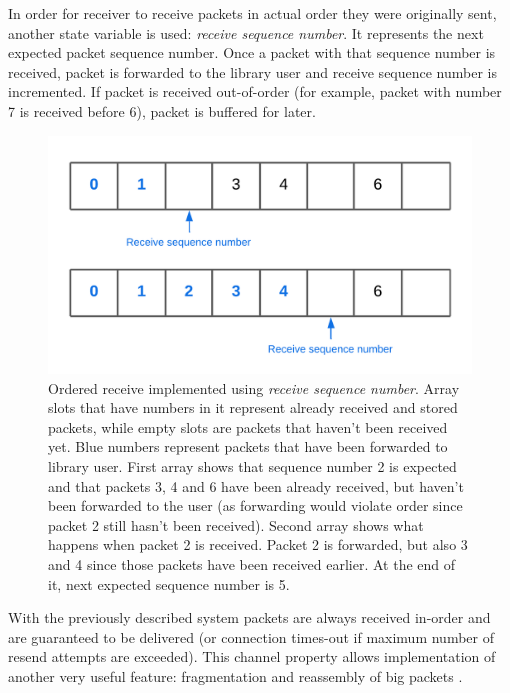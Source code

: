 \documentclass[times, utf8, diplomski]{fer}
\begin{document}
In order for receiver to receive packets in actual order they were originally sent, another state variable is used: \textit{receive sequence number}. It represents the next expected packet sequence number. Once a packet with that sequence number is received, packet is forwarded to the library user and receive sequence number is incremented. If packet is received out-of-order (for example, packet with number 7 is received before 6), packet is buffered for later.

\begin{figure}[H]
	\centering
	\includegraphics[scale=0.25]{Ordered-receive}
	\caption{Ordered receive implemented using \textit{receive sequence number}. Array slots that have numbers in it represent already received and stored packets, while empty slots are packets that haven't been received yet. Blue numbers represent packets that have been forwarded to library user. First array shows that sequence number 2 is expected and that packets 3, 4 and 6 have been already received, but haven't been forwarded to the user (as forwarding would violate order since packet 2 still hasn't been received). Second array shows what happens when packet 2 is received. Packet 2 is forwarded, but also 3 and 4 since those packets have been received earlier. At the end of it, next expected sequence number is 5.}
\end{figure}

With the previously described system packets are always received in-order and are guaranteed to be delivered (or connection times-out if maximum number of resend attempts are exceeded). This channel property allows implementation of another very useful feature: fragmentation and reassembly of big packets \cite{GafferOnGames:Sending-large-blocks-of-data}.\\
\end{document}

